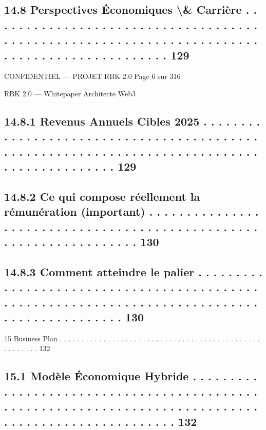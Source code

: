 \subsection{14.8    Perspectives Économiques \textbackslash{}& Carrière . . . . . . . . . . . . . . . . . . . . . . . . . . . . . . . . . . . . . . . . . . . . . . . . . . . . . . . . . . . . . . . . . . . . . . . . . . . . . . . . . . . . . . . . . . . . 129}
\vspace{0.5em}
\vspace{0.5em}
\begin{confidential}CONFIDENTIEL — PROJET RBK 2.0                                                                       Page 6 sur 316\end{confidential}
RBK 2.0 — Whitepaper Architecte Web3\\
\vspace{0.5em}
\vspace{0.5em}
\subsection{14.8.1              Revenus Annuels Cibles 2025 . . . . . . . . . . . . . . . . . . . . . . . . . . . . . . . . . . . . . . . . . . . . . . . . . . . . . . . . . . . . . . . . . . . . . . . . . . . . . . . . . . . . . . . . . . . 129}
\subsection{14.8.2              Ce qui compose réellement la rémunération (important) . . . . . . . . . . . . . . . . . . . . . . . . . . . . . . . . . . . . . . . . . . . . . . . . . . . . . . . . . . . . . . . . . . . 130}
\subsection{14.8.3              Comment atteindre le palier . . . . . . . . . . . . . . . . . . . . . . . . . . . . . . . . . . . . . . . . . . . . . . . . . . . . . . . . . . . . . . . . . . . . . . . . . . . . . . . . . . . . . . . . . . . . . 130}
\vspace{0.5em}
15    Business Plan . . . . . . . . . . . . . . . . . . . . . . . . . . . . . . . . . . . . . . . . . . . . . . . . . . . . . . 132\\
\subsection{15.1    Modèle Économique Hybride . . . . . . . . . . . . . . . . . . . . . . . . . . . . . . . . . . . . . . . . . . . . . . . . . . . . . . . . . . . . . . . . . . . . . . . . . . . . . . . . . . . . . . . . . . . . . . . . . . . . 132}
